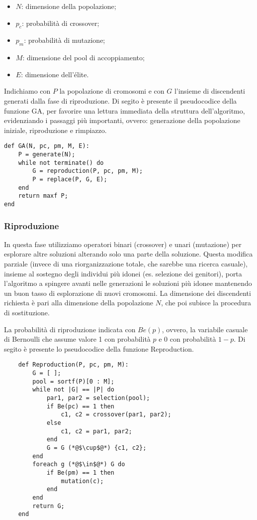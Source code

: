 \begin{itemize}
    \item $N$: dimensione della popolazione;
    \item $p_c$: probabilità di crossover;
    \item $p_m$: probabilità di mutazione;
    \item $M$: dimensione del pool di accoppiamento;
    \item $E$: dimensione dell'élite.
\end{itemize}

Indichiamo con $P$ la popolazione di cromosomi e con $G$ l'insieme di discendenti generati dalla fase di riproduzione. Di segito è presente il pseudocodice della funzione GA, per favorire una lettura immediata della struttura dell'algoritmo, evidenziando i passaggi più importanti, ovvero: generazione della popolazione iniziale, riproduzione e rimpiazzo.

\begin{lstlisting}
def GA(N, pc, pm, M, E):
    P = generate(N);
    while not terminate() do
        G = reproduction(P, pc, pm, M);
        P = replace(P, G, E);
    end
    return maxf P;
end
\end{lstlisting}

\subsubsection{Riproduzione}
In questa fase utilizziamo operatori binari (crossover) e unari (mutazione) per esplorare altre soluzioni alterando solo una parte della soluzione. Questa modifica parziale (invece di una riorganizzazione totale, che sarebbe una ricerca casuale), insieme al sostegno degli individui più idonei (es. selezione dei genitori), porta l'algoritmo a spingere avanti nelle generazioni le soluzioni più idonee mantenendo un buon tasso di esplorazione di nuovi cromosomi. La dimensione dei discendenti richiesta è pari alla dimensione della popolazione $N$, che poi subisce la procedura di sostituzione.

La probabilità di riproduzione indicata con $Be(p)$, ovvero, la variabile casuale di Bernoulli che assume valore 1 con probabilità $p$ e 0 con probabilità $1-p$. Di segito è presente lo pseudocodice della funzione Reproduction.

\begin{lstlisting}
    def Reproduction(P, pc, pm, M):
        G = [ ];
        pool = sortf(P)[0 : M];
        while not |G| == |P| do
            par1, par2 = selection(pool);
            if Be(pc) == 1 then
                c1, c2 = crossover(par1, par2);
            else
                c1, c2 = par1, par2;
            end
            G = G (*@$\cup$@*) {c1, c2};
        end
        foreach g (*@$\in$@*) G do
            if Be(pm) == 1 then
                mutation(c);
            end
        end
        return G;
    end
\end{lstlisting}

